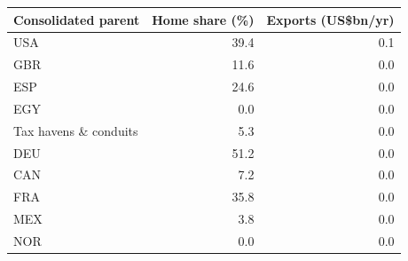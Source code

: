\begin{tabular}{lrr}
\toprule
Consolidated parent & Home share (\%) & Exports (US\$bn/yr) \\
\midrule
USA & 39.4 & 0.1 \\
GBR & 11.6 & 0.0 \\
ESP & 24.6 & 0.0 \\
EGY & 0.0 & 0.0 \\
Tax havens \& conduits & 5.3 & 0.0 \\
DEU & 51.2 & 0.0 \\
CAN & 7.2 & 0.0 \\
FRA & 35.8 & 0.0 \\
MEX & 3.8 & 0.0 \\
NOR & 0.0 & 0.0 \\
\bottomrule
\end{tabular}

